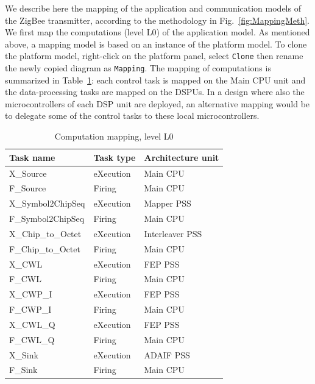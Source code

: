 \documentclass{llncs}
\begin{document}
\noindent
We describe here the mapping of the application and communication models of the ZigBee transmitter, according to the
methodology in Fig.~\ref{fig:MappingMeth}.\\
%
We first map the computations (level L0) of the application model. As mentioned above, a mapping model is based on an
instance of the platform model. To clone the platform model, right-click on the platform panel, select \texttt{Clone}
then rename the newly copied diagram as \texttt{Mapping}. The mapping of computations is summarized in
Table~\ref{tab:MappingL0}: each control task is mapped on the Main CPU unit and the data-processing tasks are mapped on
the DSPUs. In a design where also the microcontrollers of each DSP unit are deployed, an alternative mapping would be to
delegate some of the control tasks to these local microcontrollers.
%
\begin{table}
\centering
\caption{Computation mapping, level L0}
\label{tab:MappingL0}
\begin{tabular}{| >{\centering\arraybackslash}l | >{\centering\arraybackslash}l | >{\centering\arraybackslash}l |}
	\hline
		\textbf{Task name}		& \textbf{Task type}	&	\textbf{Architecture unit} \\ \hline
		X\_Source							& eXecution			& Main CPU 					\\ \hline
		F\_Source							& Firing				& Main CPU 					\\ \hline
		X\_Symbol2ChipSeq			& eXecution			& Mapper PSS 				\\ \hline
		F\_Symbol2ChipSeq			& Firing 				& Main CPU 					\\ \hline
		X\_Chip\_to\_Octet		&	eXecution 		& Interleaver PSS 	\\ \hline
		F\_Chip\_to\_Octet		&	Firing 				& Main CPU 					\\ \hline
		X\_CWL								&	eXecution 		& FEP PSS 					\\ \hline
		F\_CWL								&	Firing 				& Main CPU 					\\ \hline
		X\_CWP\_I							&	eXecution			& FEP PSS						\\ \hline
		F\_CWP\_I							&	Firing 				& Main CPU 					\\ \hline
		X\_CWL\_Q							&	eXecution 		& FEP PSS						\\ \hline
		F\_CWL\_Q							&	Firing 				& Main CPU 					\\ \hline
		X\_Sink								&	eXecution 		& ADAIF PSS					\\ \hline
		F\_Sink								&	Firing 				& Main CPU 					\\ \hline
\end{tabular}
\end{table}
\end{document}
